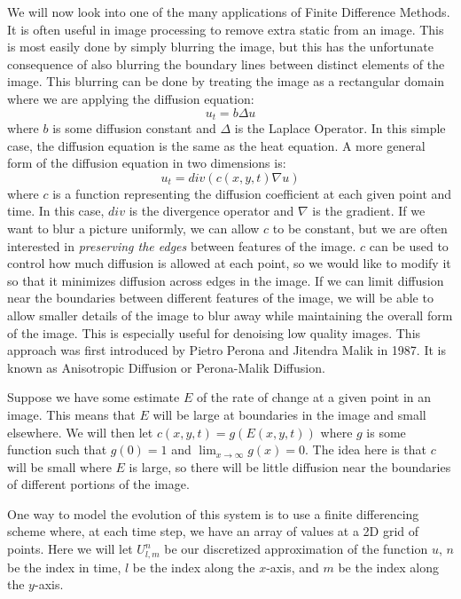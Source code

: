 \label{lab:AnisotropicDiffusion}


We will now look into one of the many applications of Finite Difference Methods.
It is often useful in image processing to remove extra static from an image.
This is most easily done by simply blurring the image, but this has the unfortunate consequence of also blurring the boundary lines between distinct elements of the image.
This blurring can be done by treating the image as a rectangular domain where we are applying the diffusion equation:
\[u_t = b \Delta u\]
where $b$ is some diffusion constant and $\Delta$ is the Laplace Operator.
In this simple case, the diffusion equation is the same as the heat equation.
A more general form of the diffusion equation in two dimensions is:
\[u_t = div \left( c(x,y,t) \nabla u \right)\]
where $c$ is a function representing the diffusion coefficient at each given point and time.
In this case, $div$ is the divergence operator and $\nabla$ is the gradient.
If we want to blur a picture uniformly, we can allow $c$ to be constant, but we are often interested in \textit{preserving the edges} between features of the image.
$c$ can be used to control how much diffusion is allowed at each point, so we would like to modify it so that it minimizes diffusion across edges in the image.
If we can limit diffusion near the boundaries between different features of the image, we will be able to allow smaller details of the image to blur away while maintaining the overall form of the image.
This is especially useful for denoising low quality images.
This approach was first introduced by Pietro Perona and Jitendra Malik in 1987.
It is known as Anisotropic Diffusion or Perona-Malik Diffusion.

Suppose we have some estimate $E$ of the rate of change at a given point in an image.
This means that $E$ will be large at boundaries in the image and small elsewhere.
We will then let $c(x,y,t) = g(E(x,y,t))$ where $g$ is some function such that $g(0)=1$ and $\displaystyle{\lim_{x \to \infty} g(x) = 0}$.
The idea here is that $c$ will be small where $E$ is large, so there will be little diffusion near the boundaries of different portions of the image.

One way to model the evolution of this system is to use a finite differencing scheme where, at each time step, we have an array of values at a 2D grid of points.
Here we will let $U_{l,m}^n$ be our discretized approximation of the function $u$, $n$ be the index in time, $l$ be the index along the $x$-axis, and $m$ be the index along the $y$-axis.

